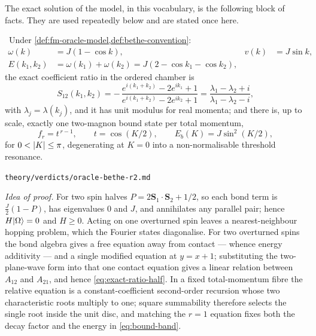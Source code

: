 The exact solution of the model, in this vocabulary, is the following block of
facts. They are used repeatedly below and are stated once here.

\begin{oracle}
\label{thm:bethe-oracle-facts}
\statusProved\ Under \cref{def:fm-oracle-model,def:bethe-convention}:
\begin{align}
  \omega(k)&=J(1-\cos k), & v(k)&=J\sin k, \\
  E(k_1,k_2)&=\omega(k_1)+\omega(k_2)=J(2-\cos k_1-\cos k_2), & &
\end{align}
the exact coefficient ratio in the ordered chamber is
\begin{equation}
  S_{12}(k_1,k_2)
  =-\,\frac{e^{i(k_1+k_2)}-2e^{ik_1}+1}{e^{i(k_1+k_2)}-2e^{ik_2}+1}
  =\frac{\lambda_1-\lambda_2+i}{\lambda_1-\lambda_2-i},
  \label{eq:exact-ratio-half}
\end{equation}
with $\lambda_j=\lambda(k_j)$, and it has unit modulus for real momenta; and
there is, up to scale, exactly one two-magnon bound state per total momentum,
\begin{equation}
  f_r=t^{\,r-1},\qquad t=\cos(K/2),\qquad E_b(K)=J\sin^2(K/2),
  \label{eq:bound-band}
\end{equation}
for $0<\lvert K\rvert\le\pi$, degenerating at $K=0$ into a non-normalisable threshold
resonance.
\end{oracle}
%
{\texttt{theory/verdicts/oracle-bethe-r2.md}}

\emph{Idea of proof.} For two spin halves $P=2\bm{S}_1\cdot\bm{S}_2+1/2$, so
each bond term is $\tfrac{J}{2}(1-P)$, has eigenvalues $0$ and $J$, and
annihilates any parallel pair; hence $H|\Omega\rangle=0$ and $H\ge0$. Acting on
one overturned spin leaves a nearest-neighbour hopping problem, which the
Fourier states diagonalise. For two overturned spins the bond algebra gives a
free equation away from contact --- whence energy additivity --- and a single
modified equation at $y=x+1$; substituting the two-plane-wave form into that
one contact equation gives a linear relation between $A_{12}$ and $A_{21}$,
and hence \cref{eq:exact-ratio-half}. In a fixed total-momentum fibre the
relative equation is a constant-coefficient second-order recursion whose two
characteristic roots multiply to one; square summability therefore selects the
single root inside the unit disc, and matching the $r=1$ equation fixes both
the decay factor and the energy in \cref{eq:bound-band}.


